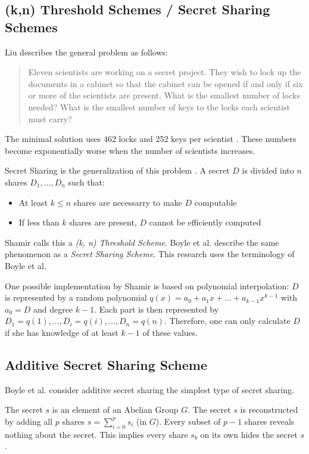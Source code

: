 \label{ch_FunctionSecretSharing}
\subsection{(k,n) Threshold Schemes / Secret Sharing Schemes}
\label{sub:ThresholdSchemes}
Liu \cite{liu1968combMath} describes the general problem as follows: 
\begin{quote}
Eleven scientists are working on a secret project. 
They wish to lock up the documents in a cabinet so that the cabinet can be opened if and only if six or more of the scientists are present.
What is the smallest number of locks needed?
What is the smallest number of keys to the locks each scientist must carry?
\end{quote}
The minimal solution uses 462 locks and 252 keys per scientist \cite{shamir1979share}.
These numbers become exponentially worse when the number of scientists increases.

Secret Sharing is the generalization of this problem \cite{brickell1989schemes}.
A secret $D$ is divided into $n$ shares $D_1,...,D_n$ such that:
\begin{itemize}
    \item At least $k\leq n$ shares are necessarry to make $D$ computable
    \item If less than $k$ shares are present, $D$ cannot be efficiently computed
\end{itemize} 
Shamir \cite{shamir1979share} calls this a \textit{(k, n) Threshold Scheme}.
Boyle et al. \cite{boyle2015function} describe the same phenomenon as a \textit{Secret Sharing Scheme}. 
This research uses the terminology of Boyle et al.

One possible implementation by Shamir \cite{shamir1979share} is based on polynomial interpolation:
$D$ is represented by a random polynomial $q(x)=a_0+a_1x+...+a_{k-1}x^{k-1}$ with $a_0=D$ and degree $k-1$.
Each part is then represented by $D_1=q(1),...,D_i=q(i),...,D_n=q(n)$.
Therefore, one can only calculate $D$ if she has knowledge of at least $k-1$ of these values.  

\subsection{Additive Secret Sharing Scheme}
\label{sub:AdditiveSecretSharingScheme}
Boyle et al. \cite{boyle2015function} consider additive secret sharing the simplest type of secret sharing.

The secret $s$ is an element of an Abelian Group $G$.
The secret $s$ is reconstructed by adding all $p$ shares $s=\sum_{i=0}^p s_i$ (in $G$). 
Every subset of $p-1$ shares reveals nothing about the secret.
This implies every share $s_b$ on its own hides the secret $s$.


